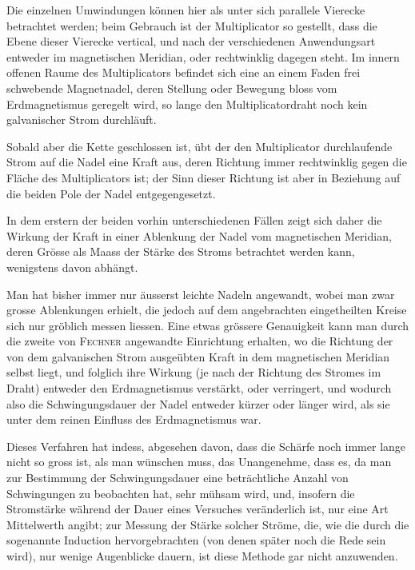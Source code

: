 \documentclass[12pt,a4paper]{article}
\begin{document}
Die einzelnen Umwindungen können hier als unter sich parallele Vierecke betrachtet werden; beim Gebrauch ist der Multiplicator so gestellt, dass die Ebene dieser Vierecke vertical, und nach der verschiedenen Anwendungsart entweder im magnetischen Meridian, oder rechtwinklig dagegen steht. Im innern offenen Raume des Multiplicators befindet sich eine an einem Faden frei schwebende Magnetnadel, deren Stellung oder Bewegung bloss vom Erdmagnetismus geregelt wird, so lange den Multiplicatordraht noch kein galvanischer Strom durchläuft.

Sobald aber die Kette geschlossen ist, übt der den Multiplicator durchlaufende Strom auf die Nadel eine Kraft aus, deren Richtung immer rechtwinklig gegen die Fläche des Multiplicators ist; der Sinn dieser Richtung ist aber in Beziehung auf die beiden Pole der Nadel entgegengesetzt.

In dem erstern der beiden vorhin unterschiedenen Fällen zeigt sich daher die Wirkung der Kraft in einer Ablenkung der Nadel vom magnetischen Meridian, deren Grösse als Maass der Stärke des Stroms betrachtet werden kann, wenigstens davon abhängt.

Man hat bisher immer nur äusserst leichte Nadeln angewandt, wobei man zwar grosse Ablenkungen erhielt, die jedoch auf dem angebrachten eingetheilten Kreise sich nur gröblich messen liessen. Eine etwas grössere Genauigkeit kann man durch die zweite von \textsc{Fechner} angewandte Einrichtung erhalten, wo die Richtung der von dem galvanischen Strom ausgeübten Kraft in dem magnetischen Meridian selbst liegt, und folglich ihre Wirkung (je nach der Richtung des Stromes im Draht) entweder den Erdmagnetismus verstärkt, oder verringert, und wodurch also die Schwingungsdauer der Nadel entweder kürzer oder länger wird, als sie unter dem reinen Einfluss des Erdmagnetismus war.

Dieses Verfahren hat indess, abgesehen davon, dass die Schärfe noch immer lange nicht so gross ist, als man wünschen muss, das Unangenehme, dass es, da man zur Bestimmung der Schwingungsdauer eine beträchtliche Anzahl von Schwingungen zu beobachten hat, sehr mühsam wird, und, insofern die Stromstärke während der Dauer eines Versuches veränderlich ist, nur eine Art Mittelwerth angibt; zur Messung der Stärke solcher Ströme, die, wie die durch die sogenannte Induction hervorgebrachten (von denen später noch die Rede sein wird), nur wenige Augenblicke dauern, ist diese Methode gar nicht anzuwenden.

\bigskip
\end{document}

